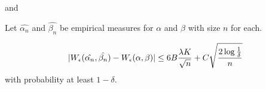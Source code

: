and

\begin{lemma}
	Let $\hat{\alpha_n}$ and $\hat{\beta_n}$ be empirical measures for $\alpha$ and $\beta$ with size $n$ for each.
	
	\[
	\lvert W_{\epsilon}(\hat{\alpha_n},\hat{\beta_n})-W_{\epsilon}(\alpha,\beta)\rvert \leq 6B \frac{\lambda K}{\sqrt{n}} + C\sqrt{\frac{2 \log\frac{1}{\delta}}{n}}
	\] with probability at least $1-\delta$.
\end{lemma}

%
%
%
